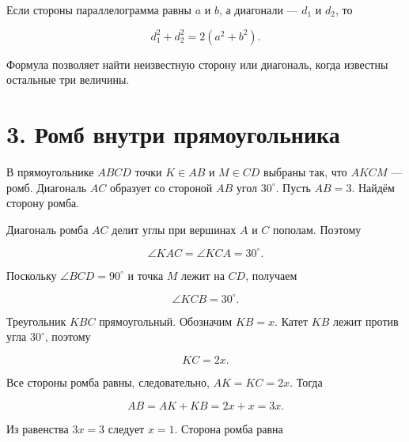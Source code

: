 \documentclass[a4paper,12pt]{article}
\begin{document}
Если стороны параллелограмма равны $a$ и $b$, а диагонали --- $d_1$ и $d_2$, то

\[
\boxed{d_1^2+d_2^2=2(a^2+b^2)}.
\]

Формула позволяет найти неизвестную сторону или диагональ, когда известны остальные три величины.

\section*{\color{darkaccent}3. Ромб внутри прямоугольника}

В прямоугольнике $ABCD$ точки $K\in AB$ и $M\in CD$ выбраны так, что $AKCM$ --- ромб. Диагональ $AC$ образует со стороной $AB$ угол $30^\circ$. Пусть $AB=3$. Найдём сторону ромба.

\begin{center}
\end{center}

Диагональ ромба $AC$ делит углы при вершинах $A$ и $C$ пополам. Поэтому

\[
\angle KAC=\angle KCA=30^\circ.
\]

Поскольку $\angle BCD=90^\circ$ и точка $M$ лежит на $CD$, получаем

\[
\angle KCB=30^\circ.
\]

Треугольник $KBC$ прямоугольный. Обозначим $KB=x$. Катет $KB$ лежит против угла $30^\circ$, поэтому

\[
KC=2x.
\]

Все стороны ромба равны, следовательно, $AK=KC=2x$. Тогда

\[
AB=AK+KB=2x+x=3x.
\]

Из равенства $3x=3$ следует $x=1$. Сторона ромба равна
\end{document}
